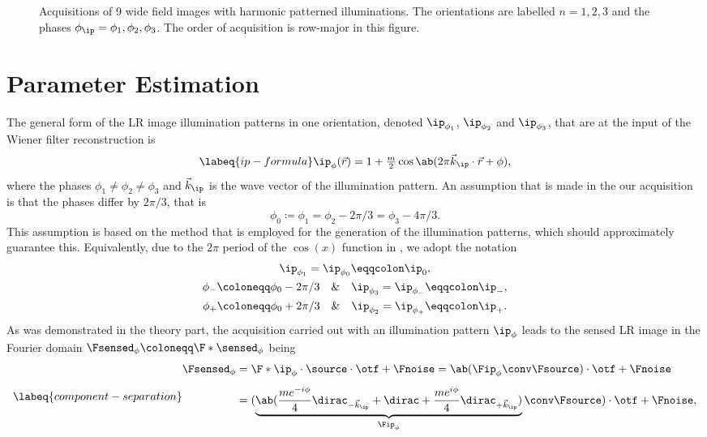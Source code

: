 \begin{figure}
  \caption{Acquisitions of 9 wide field images with harmonic patterned illuminations. The orientations are labelled
     \(n = 1, 2, 3 \) and the phases \(\phi_\ip = \phi_1,\phi_2,\phi_3\). The order of acquisition is row-major in this
    figure.}
\end{figure}%

\section{Parameter Estimation}
The general form of the \ac{LR} image illumination patterns in one orientation, denoted \(\ip_{\phi_1}\), 
    \(\ip_{\phi_2}\) and \(\ip_{\phi_3}\), that are at the input of the Wiener filter reconstruction is
    \begin{equation}
        \labeq{ip-formula}
        \ip_{\phi}(\vec{r}) = 1 + \tfrac{m}{2} \cos\ab(2\pi \vec{k}_\ip \cdot \vec{r} + \phi),
    \end{equation}
    where the phases \(\phi_1 \neq \phi_2 \neq \phi_3\) and \(\vec{k}_\ip\) is the wave vector of the illumination pattern.
An assumption that is made in the our acquisition is that the phases differ by \(2\pi/3\), that is 
    \[
        \phi_0 \coloneqq \phi_1 = \phi_2 - 2\pi/3 = \phi_3 - 4\pi/3.
    \]
This assumption is based on the method that is employed for the generation of the illumination patterns, which should
    approximately guarantee this.
Equivalently, due to the \(2\pi\) period of the \(\cos(x)\) function in , we adopt the notation
    \begin{gather*}
        \ip_{\phi_1} = \ip_{\phi_0} \eqqcolon \ip_0,\\
        \phi_{-} \coloneqq \phi_0 - 2\pi/3 \quad\&\quad \ip_{\phi_3} = \ip_{\phi_{-}} \eqqcolon \ip_{-},\\
        \phi_{+} \coloneqq \phi_0 + 2\pi/3 \quad\&\quad \ip_{\phi_2} = \ip_{\phi_{+}} \eqqcolon \ip_{+}.
    \end{gather*}
As was demonstrated in the theory part, the acquisition carried out with an illumination pattern \(\ip_\phi\) leads to
    the sensed \ac{LR} image in the Fourier domain \(\Fsensed_\phi \coloneqq \F*{\sensed_\phi}\) being
    \begin{equation}
        \labeq{component-separation}
        \begin{split}
            \Fsensed_\phi &= \F*{\ip_\phi \cdot\source} \cdot \otf
            + \Fnoise  = \ab(\Fip_\phi \conv \Fsource) \cdot \otf + \Fnoise\\[1ex]
                          &= (\underbrace{\ab(\frac{me^{-i \phi}}{4} \dirac_{-\vec{k}_\ip} + \dirac +
                          \frac{me^{i \phi}}{4} \dirac_{+\vec{k}_\ip})}_{\Fip_{\phi}} \conv \Fsource)\cdot\otf + \Fnoise,
        \end{split}
    \end{equation}
